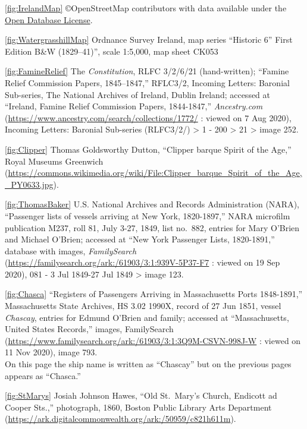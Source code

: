 
\raggedright
\setlength{\parskip}{1em}

\ref{fig:IrelandMap} \copyright OpenStreetMap contributors with data available under the \href{https://www.openstreetmap.org/copyright}{Open Database License}.

\ref{fig:WatergrasshillMap} Ordnance Survey Ireland, map series ``Historic 6'' First Edition B\&W (1829--41)'', scale 1:5,000, map sheet CK053

\ref{fig:FamineRelief} The \textit{Constitution}, RLFC 3/2/6/21 (hand-written); ``Famine Relief Commission Papers, 1845–1847,'' RFLC3/2, Incoming Letters: Baronial Sub-series, The National Archives of Ireland, Dublin Ireland;
accessed at ``Ireland, Famine Relief Commission Papers, 1844-1847,'' \textit{Ancestry.com} (\url{https://www.ancestry.com/search/collections/1772/} : viewed on 7 Aug 2020), Incoming Letters: Baronial Sub-series (RLFC3/2/) > 1 - 200 > 21 > image 252.

\ref{fig:Clipper} Thomas Goldsworthy Dutton, ``Clipper barque Spirit of the Age,'' Royal Museums Greenwich (\url{https://commons.wikimedia.org/wiki/File:Clipper_barque_Spirit_of_the_Age,_PY0633.jpg}).

\ref{fig:ThomasBaker} U.S. National Archives and Records Administration (NARA), ``Passenger lists of vessels arriving at New York, 1820-1897,'' NARA microfilm publication M237, roll 81, July 3-27, 1849, list no.\ 882, entries for Mary O'Brien and Michael O'Brien; accessed at ``New York Passenger Lists, 1820-1891,'' database with images, \textit{FamilySearch} (\url{https://familysearch.org/ark:/61903/3:1:939V-5P37-F7} : viewed on 19 Sep 2020), 081 - 3 Jul 1849-27 Jul 1849 > image 123.

\ref{fig:Chasca} ``Registers of Passengers Arriving in Massachusetts Ports 1848-1891,'' Massachusetts State Archives, HS 3.02 1990X, record of 27 Jun 1851, vessel \textit{Chascay}, entries for Edmund O'Brien and family; accessed at ``Massachusetts, United States Records,'' images, FamilySearch (\url{https://www.familysearch.org/ark:/61903/3:1:3Q9M-CSVN-998J-W} : viewed on 11 Nov 2020), image 793.\\
On this page the ship name is written as ``Chascay'' but on the previous pages appears as ``Chasca.''

\ref{fig:StMarys} Josiah Johnson Hawes, ``Old St.\ Mary's Church, Endicott ad Cooper Sts.,'' photograph, 1860, Boston Public Library Arts Department (\url{https://ark.digitalcommonwealth.org/ark:/50959/c821h611m}).

